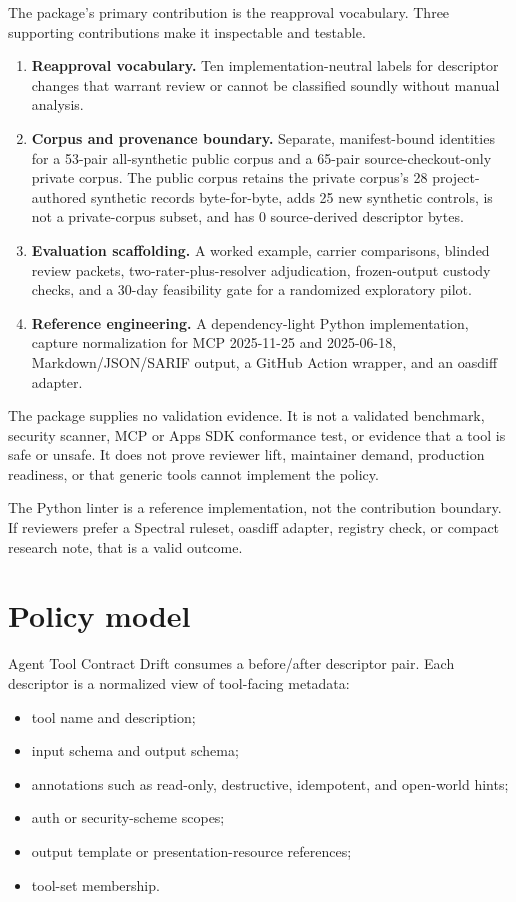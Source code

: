 \documentclass[11pt,letterpaper]{article}
\newcommand{\project}{Agent Tool Contract Drift}
\newcommand{\sarif}{SARIF}
\begin{document}
The package's primary contribution is the reapproval vocabulary. Three supporting contributions make it inspectable and testable.

\begin{enumerate}
    \item \textbf{Reapproval vocabulary.} Ten implementation-neutral labels for descriptor changes that warrant review or cannot be classified soundly without manual analysis.
    \item \textbf{Corpus and provenance boundary.} Separate, manifest-bound identities for a 53-pair all-synthetic public corpus and a 65-pair source-checkout-only private corpus. The public corpus retains the private corpus's 28 project-authored synthetic records byte-for-byte, adds 25 new synthetic controls, is not a private-corpus subset, and has 0 source-derived descriptor bytes.
    \item \textbf{Evaluation scaffolding.} A worked example, carrier comparisons, blinded review packets, two-rater-plus-resolver adjudication, frozen-output custody checks, and a 30-day feasibility gate for a randomized exploratory pilot.
    \item \textbf{Reference engineering.} A dependency-light Python implementation, capture normalization for MCP 2025-11-25 and 2025-06-18, Markdown/JSON/\sarif{} output, a GitHub Action wrapper, and an oasdiff adapter.
\end{enumerate}

The package supplies no validation evidence. It is not a validated benchmark, security scanner, MCP or Apps SDK conformance test, or evidence that a tool is safe or unsafe. It does not prove reviewer lift, maintainer demand, production readiness, or that generic tools cannot implement the policy.

The Python linter is a reference implementation, not the contribution boundary. If reviewers prefer a Spectral ruleset, oasdiff adapter, registry check, or compact research note, that is a valid outcome.

\section{Policy model}

\project{} consumes a before/after descriptor pair. Each descriptor is a normalized view of tool-facing metadata:

\begin{itemize}
    \item tool name and description;
    \item input schema and output schema;
    \item annotations such as read-only, destructive, idempotent, and open-world hints;
    \item auth or security-scheme scopes;
    \item output template or presentation-resource references;
    \item tool-set membership.
\end{itemize}
\end{document}
